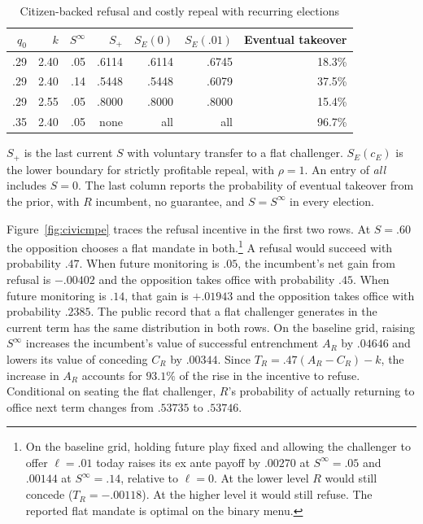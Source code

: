 \documentclass[11pt,letterpaper]{article}
\begin{document}
\begin{table}[!htbp]\centering\small
\caption{Citizen-backed refusal and costly repeal with recurring elections}\label{tab:civicmpe}
\begin{tabular}{@{}rrrrrrr@{}}
\toprule
$q_0$ & $k$ & $S^\infty$ & $S_+$ & $S_E(0)$ & $S_E(.01)$ & Eventual takeover\\
\midrule
.29 & 2.40 & .05 & .6114 & .6114 & .6745 & 18.3\%\\
.29 & 2.40 & .14 & .5448 & .5448 & .6079 & 37.5\%\\
.29 & 2.55 & .05 & .8000 & .8000 & .8000 & 15.4\%\\
.35 & 2.40 & .05 & none  & all   & all   & 96.7\%\\
\bottomrule
\end{tabular}
\par\smallskip\footnotesize $S_+$ is the last current $S$ with voluntary transfer to a flat challenger. $S_E(c_E)$ is the lower boundary for strictly profitable repeal, with $\rho=1$. An entry of \emph{all} includes $S=0$. The last column reports the probability of eventual takeover from the prior, with $R$ incumbent, no guarantee, and $S=S^\infty$ in every election.
\end{table}

Figure~\ref{fig:civicmpe} traces the refusal incentive in the first two rows. At $S=.60$ the opposition chooses a flat mandate in both.\footnote{On the baseline grid, holding future play fixed and allowing the challenger to offer $\ell=.01$ today raises its ex ante payoff by $.00270$ at $S^\infty=.05$ and $.00144$ at $S^\infty=.14$, relative to $\ell=0$. At the lower level $R$ would still concede ($T_R=-.00118$). At the higher level it would still refuse. The reported flat mandate is optimal on the binary menu.} A refusal would succeed with probability $.47$. When future monitoring is $.05$, the incumbent's net gain from refusal is $-.00402$ and the opposition takes office with probability $.45$. When future monitoring is $.14$, that gain is $+.01943$ and the opposition takes office with probability $.2385$. The public record that a flat challenger generates in the current term has the same distribution in both rows. On the baseline grid, raising $S^\infty$ increases the incumbent's value of successful entrenchment $A_R$ by $.04646$ and lowers its value of conceding $C_R$ by $.00344$. Since $T_R=.47(A_R-C_R)-k$, the increase in $A_R$ accounts for $93.1\%$ of the rise in the incentive to refuse. Conditional on seating the flat challenger, $R$'s probability of actually returning to office next term changes from $.53735$ to $.53746$.
\end{document}
